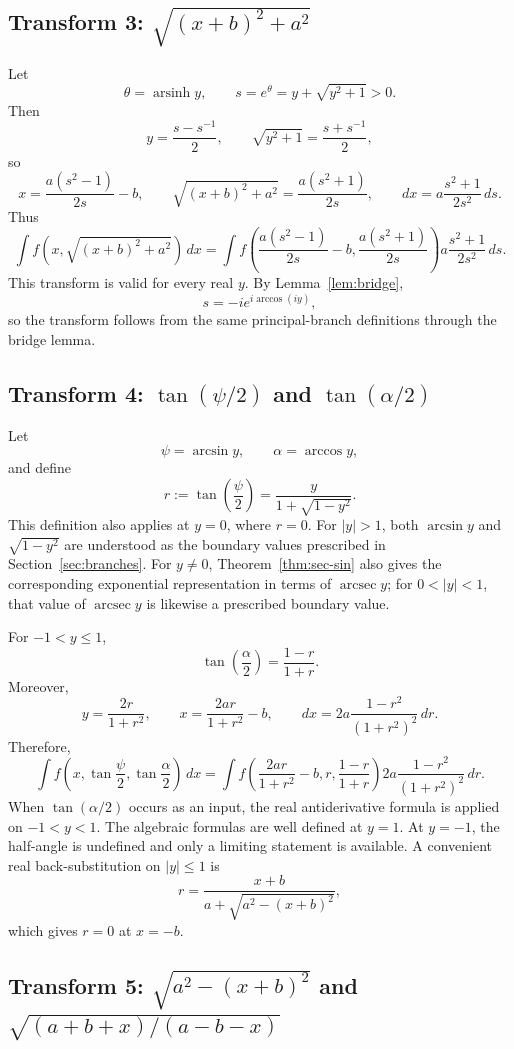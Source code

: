 \documentclass[11pt]{article}
\theoremstyle{remark}
\DeclareMathOperator{\arcsec}{arcsec}
\DeclareMathOperator{\arsinh}{arsinh}
\begin{document}
\subsection*{Transform 3: $\sqrt{(x+b)^2+a^2}$}

Let
\[
\theta=\arsinh y,
\qquad
s=e^\theta=y+\sqrt{y^2+1}>0.
\]
Then
\[
y=\frac{s-s^{-1}}{2},
\qquad
\sqrt{y^2+1}=\frac{s+s^{-1}}{2},
\]
so
\[
x=\frac{a(s^2-1)}{2s}-b,
\qquad
\sqrt{(x+b)^2+a^2}=\frac{a(s^2+1)}{2s},
\qquad
dx=a\frac{s^2+1}{2s^2}\,ds.
\]
Thus
\[
\int f\!\left(x,\sqrt{(x+b)^2+a^2}\right)\,dx
=
\int f\!\left(\frac{a(s^2-1)}{2s}-b,\frac{a(s^2+1)}{2s}\right)
a\frac{s^2+1}{2s^2}\,ds.
\]
This transform is valid for every real $y$. By Lemma~\ref{lem:bridge},
\[
s=-ie^{i\arccos(iy)},
\]
so the transform follows from the same principal-branch definitions through the bridge lemma.

\subsection*{Transform 4: $\tan(\psi/2)$ and $\tan(\alpha/2)$}

Let
\[
\psi=\arcsin y,
\qquad
\alpha=\arccos y,
\]
and define
\[
r:=\tan\!\left(\frac{\psi}{2}\right)
=\frac{y}{1+\sqrt{1-y^2}}.
\]
This definition also applies at $y=0$, where $r=0$. For $|y|>1$, both $\arcsin y$ and $\sqrt{1-y^2}$ are understood as the boundary values prescribed in Section~\ref{sec:branches}. For $y\ne0$, Theorem~\ref{thm:sec-sin} also gives the corresponding exponential representation in terms of $\arcsec y$; for $0<|y|<1$, that value of $\arcsec y$ is likewise a prescribed boundary value.

For $-1<y\le1$,
\[
\tan\!\left(\frac{\alpha}{2}\right)=\frac{1-r}{1+r}.
\]
Moreover,
\[
y=\frac{2r}{1+r^2},
\qquad
x=\frac{2ar}{1+r^2}-b,
\qquad
dx=2a\frac{1-r^2}{(1+r^2)^2}\,dr.
\]
Therefore,
\[
\int f\!\left(x,\tan\frac{\psi}{2},\tan\frac{\alpha}{2}\right)\,dx
=
\int f\!\left(\frac{2ar}{1+r^2}-b,r,\frac{1-r}{1+r}\right)
2a\frac{1-r^2}{(1+r^2)^2}\,dr.
\]
When $\tan(\alpha/2)$ occurs as an input, the real antiderivative formula is applied on $-1<y<1$. The algebraic formulas are well defined at $y=1$. At $y=-1$, the half-angle is undefined and only a limiting statement is available. A convenient real back-substitution on $|y|\le1$ is
\[
r=\frac{x+b}{a+\sqrt{a^2-(x+b)^2}},
\]
which gives $r=0$ at $x=-b$.

\subsection*{Transform 5: $\sqrt{a^2-(x+b)^2}$ and $\sqrt{(a+b+x)/(a-b-x)}$}
\end{document}
